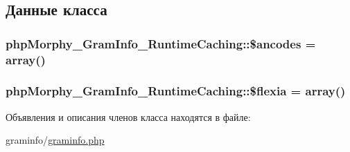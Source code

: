 \subsection{Данные класса}
\hypertarget{classphpMorphy__GramInfo__RuntimeCaching_a527916c12a65fd2268a1846c4b0e7324}{
\subsubsection[{\$ancodes}]{\setlength{\rightskip}{0pt plus 5cm}phpMorphy\_\-GramInfo\_\-RuntimeCaching::\$ancodes = array()}}
\label{classphpMorphy__GramInfo__RuntimeCaching_a527916c12a65fd2268a1846c4b0e7324}
\hypertarget{classphpMorphy__GramInfo__RuntimeCaching_afa39d553eca4b3c46f88ae89dfe3f00c}{
\subsubsection[{\$flexia}]{\setlength{\rightskip}{0pt plus 5cm}phpMorphy\_\-GramInfo\_\-RuntimeCaching::\$flexia = array()}}
\label{classphpMorphy__GramInfo__RuntimeCaching_afa39d553eca4b3c46f88ae89dfe3f00c}


Объявления и описания членов класса находятся в файле:\begin{DoxyCompactItemize}
\item 
graminfo/\hyperlink{graminfo_8php}{graminfo.php}\end{DoxyCompactItemize}
